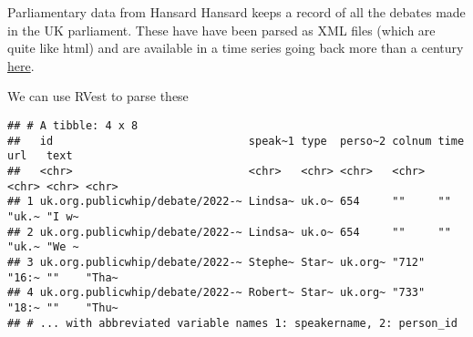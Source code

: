 \documentclass[
  10pt,
  ignorenonframetext,
  aspectratio=169]{beamer}
\newenvironment{Shaded}{\begin{snugshade}}{\end{snugshade}}
\newcommand{\FunctionTok}[1]{\textcolor[rgb]{0.94,0.94,0.56}{#1}}
\newcommand{\NormalTok}[1]{\textcolor[rgb]{0.80,0.80,0.80}{#1}}
\newcommand{\OtherTok}[1]{\textcolor[rgb]{0.94,0.94,0.56}{#1}}
\newcommand{\SpecialCharTok}[1]{\textcolor[rgb]{0.86,0.64,0.64}{#1}}
\newcommand{\StringTok}[1]{\textcolor[rgb]{0.80,0.58,0.58}{#1}}
\begin{document}
\begin{frame}[fragile]{Parliamentary data from Hansard}
\protect\hypertarget{parliamentary-data-from-hansard}{}
Hansard keeps a record of all the debates made in the UK parliament.
These have have been parsed as XML files (which are quite like html) and
are available in a time series going back more than a century
\href{https://parser.theyworkforyou.com/hansard.html}{here}.

We can use RVest to parse these

\scriptsize

\begin{Shaded}
\end{Shaded}

\begin{verbatim}
## # A tibble: 4 x 8
##   id                              speak~1 type  perso~2 colnum time  url   text 
##   <chr>                           <chr>   <chr> <chr>   <chr>  <chr> <chr> <chr>
## 1 uk.org.publicwhip/debate/2022-~ Lindsa~ uk.o~ 654     ""     ""    "uk.~ "I w~
## 2 uk.org.publicwhip/debate/2022-~ Lindsa~ uk.o~ 654     ""     ""    "uk.~ "We ~
## 3 uk.org.publicwhip/debate/2022-~ Stephe~ Star~ uk.org~ "712"  "16:~ ""    "Tha~
## 4 uk.org.publicwhip/debate/2022-~ Robert~ Star~ uk.org~ "733"  "18:~ ""    "Thu~
## # ... with abbreviated variable names 1: speakername, 2: person_id
\end{verbatim}
\end{frame}
\end{document}
